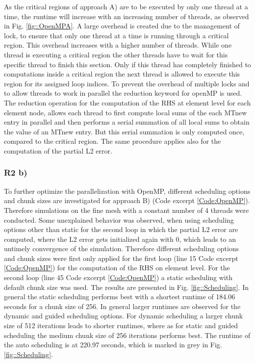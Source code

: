 \documentclass[a4paper, 11pt, oneside]{scrartcl}
\newcommand{\refFig}[1]{Fig. \ref{#1}}
\newcommand{\refCode}[1]{Code excerpt \ref{#1}}
\begin{document}
As the critical regions of approach A) are to be executed by only one thread at a time, the runtime will increase with an increasing number of threads, as observed in \refFig{fig::OpenMPA}. A large overhead is created due to the management of lock, to ensure that only one thread at a time is running through a critical region. This overhead increases with a higher number of threads. While one thread is executing a critical region the other threads have to wait for this specific thread to finish this section. Only if this thread has completely finished to computations inside a critical region the next thread is allowed to execute this region for its assigned loop indices. To prevent the overhead of multiple locks and to allow threads to work in parallel the reduction keyword for openMP is used. The reduction operation for the computation of the RHS at element level for each element node, allows each thread to first compute local sums of the each MTnew entry in parallel and then performs a serial summation of all local sums to obtain the value of an MTnew entry. But this serial summation is only computed once, compared to the critical region. The same procedure applies also for the computation of the partial L2 error. 

\subsubsection{R2 b)}

To further optimize the parallelization with OpenMP, different scheduling options and chunk sizes are investigated for approach B) (\refCode{Code:OpenMP}). Therefore simulations on the fine mesh with a constant number of 4 threads were conducted. Some unexplained behavior was observed, when using scheduling options other than static for the second loop in which the partial L2 error are computed, where the L2 error gets initialized again with 0, which leads to an untimely convergence of the simulation. Therefore different scheduling options and chunk sizes were first only applied for the first loop (line 15 \refCode{Code:OpenMP}) for the computation of the RHS on element level. For the second loop (line 45 \refCode{Code:OpenMP}) a static scheduling with default chunk size was used. The results are presented in \refFig{fig::Scheduling}. 
In general the static scheduling performs best with a shortest runtime of 184.06 seconds for a chunk size of 256. In general larger runtimes are observed for the dynamic and guided scheduling options. For dynamic scheduling a larger chunk size of 512 iterations leads to shorter runtimes, where as for static and guided scheduling the medium chunk size of 256 iterations performs best. The runtime of the auto scheduling is at 220.97 seconds, which is marked in grey in \refFig{fig::Scheduling}.
\end{document}
